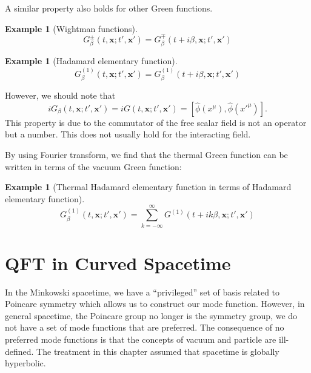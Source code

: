\documentclass[12pt]{article}
\numberwithin{equation}{section}
\theoremstyle{1style}
\newtheorem{example}[equation]{Example}
\begin{document}
A similar property also holds for other Green functions.
\begin{example}[Wightman functions]
  \[G^{\pm}_{\beta}(t,\mathbf{x};t',\mathbf{x'})=G^{\mp}_{\beta}(t+i\beta,\mathbf{x};t',\mathbf{x'})\]
\end{example}

\begin{example}[Hadamard elementary function]
  \[G_{\beta}^{(1)}(t,\mathbf{x};t',\mathbf{x'})=G_{\beta}^{(1)}(t+i\beta,\mathbf{x};t',\mathbf{x'})\]
\end{example}
However, we should note that
\begin{equation}
  iG_{\beta}(t,\mathbf{x};t',\mathbf{x'})=iG(t,\mathbf{x};t',\mathbf{x'})=\left[\hat{\phi}(x^{\mu}),\hat{\phi}(x'^{\mu})\right].
\end{equation}
This property is due to the commutator of the free scalar field is not an operator but a number.
This does not usually hold for the interacting field.

By using Fourier transform, we find that the thermal Green function can be written in terms of the vacuum Green function:
\begin{example}[Thermal Hadamard elementary function in terms of Hadamard elementary function]\label{thef}
  \[G_{\beta}^{(1)}(t,\mathbf{x};t',\mathbf{x'})=\sum_{k=-\infty}^{\infty}G^{(1)}(t+ik\beta,\mathbf{x};t',\mathbf{x'})\]
\end{example}





\newpage

\section{QFT in Curved Spacetime}
In the Minkowski spacetime, we have a ``privileged'' set of basis related to Poincare symmetry which allows us to construct our mode function.
However, in general spacetime, the Poincare group no longer is the symmetry group, we do not have a set of mode functions that are preferred.
The consequence of no preferred mode functions is that the concepts of vacuum and particle are ill-defined.
The treatment in this chapter assumed that spacetime is globally hyperbolic.
\end{document}
